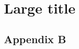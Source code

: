 
\appendix

\chapter[Short title]{Large title}

\lipsum[1-10]

\clearpage
\section{Appendix B}

\lipsum[5-15]